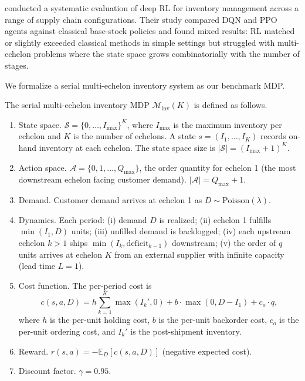 \citet{Gijsbrechts2022inventory} conducted a systematic evaluation of deep RL for inventory management across a range of supply chain configurations. Their study compared DQN and PPO agents against classical base-stock policies and found mixed results: RL matched or slightly exceeded classical methods in simple settings but struggled with multi-echelon problems where the state space grows combinatorially with the number of stages.

We formalize a serial multi-echelon inventory system as our benchmark MDP.

\begin{definition}
\label{def:inventory_mdp}
The serial multi-echelon inventory MDP $\mathcal{M}_{\mathrm{inv}}(K)$ is defined as follows.
\begin{enumerate}
    \item State space. $\mathcal{S} = \{0, \ldots, I_{\max}\}^K$, where $I_{\max}$ is the maximum inventory per echelon and $K$ is the number of echelons. A state $s = (I_1, \ldots, I_K)$ records on-hand inventory at each echelon. The state space size is $|\mathcal{S}| = (I_{\max} + 1)^K$.
    \item Action space. $\mathcal{A} = \{0, 1, \ldots, Q_{\max}\}$, the order quantity for echelon 1 (the most downstream echelon facing customer demand). $|\mathcal{A}| = Q_{\max} + 1$.
    \item Demand. Customer demand arrives at echelon 1 as $D \sim \mathrm{Poisson}(\lambda)$.
    \item Dynamics. Each period: (i) demand $D$ is realized; (ii) echelon 1 fulfills $\min(I_1, D)$ units; (iii) unfilled demand is backlogged; (iv) each upstream echelon $k > 1$ ships $\min(I_k, \text{deficit}_{k-1})$ downstream; (v) the order of $q$ units arrives at echelon $K$ from an external supplier with infinite capacity (lead time $L = 1$).
    \item Cost function. The per-period cost is
    \begin{equation}
    \label{eq:inventory_cost}
    c(s, a, D) = h \sum_{k=1}^{K} \max(I_k', 0) + b \cdot \max(0, D - I_1) + c_o \cdot q,
    \end{equation}
    where $h$ is the per-unit holding cost, $b$ is the per-unit backorder cost, $c_o$ is the per-unit ordering cost, and $I_k'$ is the post-shipment inventory.
    \item Reward. $r(s, a) = -\mathbb{E}_D[c(s, a, D)]$ (negative expected cost).
    \item Discount factor. $\gamma = 0.95$.
\end{enumerate}
\end{definition}

